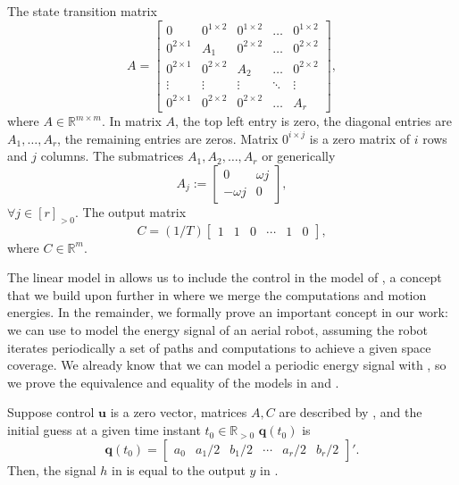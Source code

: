 The state transition matrix
\begin{equation}\label{eq:mat_A}
  A=\left[\begin{array}{ccccc}
    0            & 0^{1\times 2}& 0^{1\times 2}& \dots& 0^{1\times 2} \\
    0^{2\times 1}& A_1          & 0^{2\times 2}& \dots& 0^{2\times 2} \\
    0^{2\times 1}& 0^{2\times 2}& A_2          & \dots& 0^{2\times 2} \\
    \vdots       & \vdots       & \vdots       &\ddots& \vdots        \\
    0^{2\times 1}& 0^{2\times 2}& 0^{2\times 2}& \dots& A_r 
  \end{array}\right],
\end{equation}
where $A\in\mathbb{R}^{m\times m}$. In matrix $A$, the top left entry is zero, the diagonal entries are $A_1,\dots,A_r$, the remaining entries are zeros. Matrix $0^{i\times j}$ is a zero matrix of $i$ rows and $j$ columns. The submatrices $A_1,A_2,\dots,A_r$ or generically
\begin{equation}
  A_j:=\begin{bmatrix}0 & \omega j \\ -\omega j & 0\end{bmatrix},
\end{equation}
$\forall j\in[r]_{>0}$. The output matrix
\begin{equation}\label{eq:mat_C}
  C=(1/T)\left[\begin{array}{cccccc}
    1 & 1 & 0 &\cdots & 1 & 0
  \end{array}\right],
\end{equation}
where $C\in\mathbb{R}^m$.

The linear model in  allows us to include the control in the model of , a concept that we build upon further in  where we merge the computations and motion energies. 
In the remainder, we formally prove an important concept in our work: we can use  to model the energy signal of an aerial robot, assuming the robot iterates periodically a set of paths and computations to achieve a given space coverage. 
We already know that we can model a periodic energy signal with , so we prove the equivalence and equality of the models in  and .

\begin{highlight}
\begin{lem}\label{lem:eqv}Suppose control $\mathbf{u}$ is a zero vector, matrices $A,C$ are described by , and the initial guess at a given time instant $t_0\in\mathbb{R}_{>0}$ $\mathbf{q}(t_0)$ is 
  \begin{equation*}
  \mathbf{q}(t_0)=\begin{bmatrix}a_0 & a_1/2 & b_1/2 & \cdots & a_r/2 & b_r/2\end{bmatrix}'.
  \end{equation*} 
  Then, the signal $h$ in  is equal to the output $y$ in .
\end{lem}
\end{highlight}

